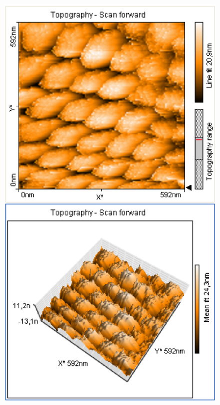 \documentclass[12pt]{article}
\begin{document}
\begin{figure}[H]
\begin{minipage}{0.4\linewidth}
\end{minipage}
\begin{minipage}{0.2\linewidth}
\centering
\end{minipage}
\begin{minipage}{0.4\linewidth}
\centering
\includegraphics[width=0.9\linewidth]{../plot/data/goldgitter/goldgitter2.eps}
\end{minipage}
\end{figure}
\end{document}
